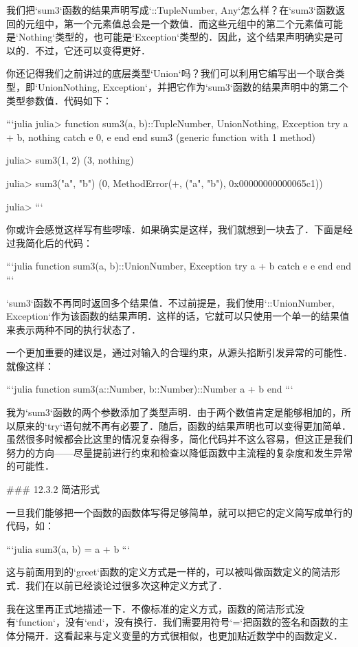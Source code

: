 我们把`sum3`函数的结果声明写成`::Tuple{Number, Any}`怎么样？在`sum3`函数返回的元组中，第一个元素值总会是一个数值．而这些元组中的第二个元素值可能是`Nothing`类型的，也可能是`Exception`类型的．因此，这个结果声明确实是可以的．不过，它还可以变得更好．

你还记得我们之前讲过的底层类型`Union`吗？我们可以利用它编写出一个联合类型，即`Union{Nothing, Exception}`，并把它作为`sum3`函数的结果声明中的第二个类型参数值．代码如下：

```julia
julia> function sum3(a, b)::Tuple{Number, Union{Nothing, Exception}}
           try
               a + b, nothing
           catch e
               0, e
           end
       end
sum3 (generic function with 1 method)

julia> sum3(1, 2)
(3, nothing)

julia> sum3("a", "b")
(0, MethodError(+, ("a", "b"), 0x00000000000065c1))

julia> 
```

你或许会感觉这样写有些啰嗦．如果确实是这样，我们就想到一块去了．下面是经过我简化后的代码：

```julia
function sum3(a, b)::Union{Number, Exception}
    try
        a + b
    catch e
        e
    end
end
```

`sum3`函数不再同时返回多个结果值．不过前提是，我们使用`::Union{Number, Exception}`作为该函数的结果声明．这样的话，它就可以只使用一个单一的结果值来表示两种不同的执行状态了．

一个更加重要的建议是，通过对输入的合理约束，从源头掐断引发异常的可能性．就像这样：

```julia
function sum3(a::Number, b::Number)::Number
    a + b
end
```

我为`sum3`函数的两个参数添加了类型声明．由于两个数值肯定是能够相加的，所以原来的`try`语句就不再有必要了．随后，函数的结果声明也可以变得更加简单．虽然很多时候都会比这里的情况复杂得多，简化代码并不这么容易，但这正是我们努力的方向——尽量提前进行约束和检查以降低函数中主流程的复杂度和发生异常的可能性．

### 12.3.2 简洁形式

一旦我们能够把一个函数的函数体写得足够简单，就可以把它的定义简写成单行的代码，如：

```julia
sum3(a, b) = a + b
```

这与前面用到的`greet`函数的定义方式是一样的，可以被叫做函数定义的简洁形式．我们在以前已经谈论过很多次这种定义方式了．
 
我在这里再正式地描述一下．不像标准的定义方式，函数的简洁形式没有`function`，没有`end`，没有换行．我们需要用符号`=`把函数的签名和函数的主体分隔开．这看起来与定义变量的方式很相似，也更加贴近数学中的函数定义．

